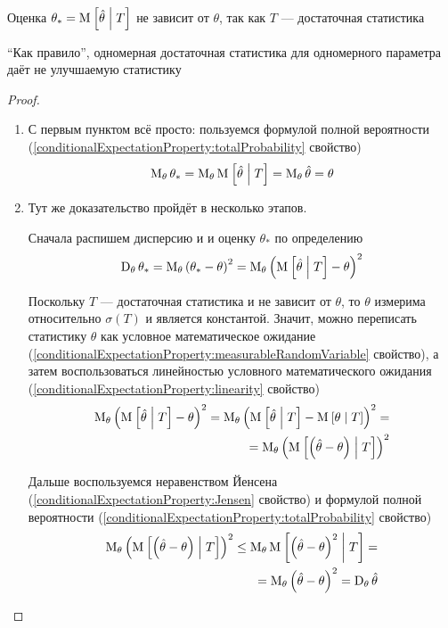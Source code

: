 \begin{remark}
  Оценка $\theta_* = \operatorname{M}_{} \left[ \hat{\theta} \;\middle|\; T \right]$ не зависит от $\theta$,
  так как $T$ --- достаточная статистика
\end{remark}

\begin{remark}
  ``Как правило'', одномерная достаточная статистика
  для одномерного параметра даёт не улучшаемую статистику
\end{remark}

\begin{proof}
  \begin{enumerate}
      \item С первым пунктом всё просто:
      пользуемся формулой полной вероятности
      (\ref{conditionalExpectationProperty:totalProbability} свойство)
      $$\operatorname{M}_{\theta} \theta_*
      = \operatorname{M}_{\theta} \operatorname{M}_{} \left[ \hat{\theta} \;\middle|\; T \right]
      = \operatorname{M}_{\theta} \hat{\theta}
      = \theta$$
      \item Тут же доказательство пройдёт в несколько этапов.

      Сначала распишем дисперсию и и оценку $\theta_*$ по определению
      $$\operatorname{D}_{\theta} \theta_*
      = \operatorname{M}_{\theta} \left( \theta_* - \theta \right)^2
      = \operatorname{M}_{\theta} \left( \operatorname{M}_{} \left[ \hat{\theta} \;\middle|\; T \right]
    - \theta \right)^2$$

      Поскольку $T$ --- достаточная статистика и не зависит от $\theta$,
      то $\theta$ измерима относительно $\sigma\left( T \right)$
      и является константой. Значит, можно переписать
      статистику $\theta$ как условное математическое ожидание
      (\ref{conditionalExpectationProperty:measurableRandomVariable}
      свойство), а затем воспользоваться линейностью
      условного математического ожидания
      (\ref{conditionalExpectationProperty:linearity} свойство)
      \begin{align*}
      \operatorname{M}_{\theta} \left( \operatorname{M}_{} \left[ \hat{\theta} \;\middle|\; T \right]
        - \theta \right)^2
    = \operatorname{M}_{\theta} \left( \operatorname{M}_{} \left[ \hat{\theta} \;\middle|\; T \right]
        - \operatorname{M}_{} \left[ \theta \;\middle|\; T \right] \right)^2 = \\
    = \operatorname{M}_{\theta} \left(
        \operatorname{M}_{} \left[ \left( \hat{\theta} - \theta \right) \;\middle|\; T \right]
        \right)^2
      \end{align*}

      Дальше воспользуемся неравенством Йенсена
      (\ref{conditionalExpectationProperty:Jensen} свойство)
      и формулой полной вероятности
      (\ref{conditionalExpectationProperty:totalProbability} свойство)
      \begin{align*}
      \operatorname{M}_{\theta} \left( \operatorname{M}_{} \left[ \left( \hat{\theta}
        - \theta \right) \;\middle|\; T \right]\right)^2
    \le \operatorname{M}_{\theta} \operatorname{M}_{} \left[ \left( \hat{\theta}
        - \theta \right)^2 \;\middle|\; T \right] = \\
    = \operatorname{M}_{\theta} \left( \hat{\theta} -\theta \right)^2
    = \operatorname{D}_{\theta} \hat{\theta}
      \end{align*}
  \end{enumerate}
\end{proof}

